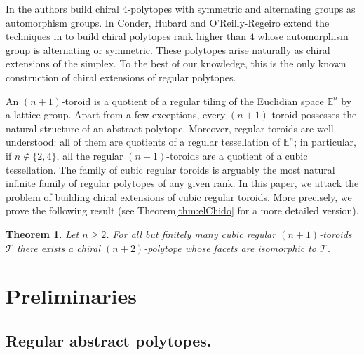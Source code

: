 \documentclass[final]{amsart}
\theoremstyle{plain}
\newtheorem{thm}{Theorem}[section]
\theoremstyle{definition}
\theoremstyle{remark}
\numberwithin{equation}{section}
\renewcommand{\{}{\lbrace}
\renewcommand{\}}{\rbrace}
\newcommand{\bE}{\mathbb{E}}
\newcommand{\cT}{\mathcal{T}}
\newcommand{\E}[1][n]{\bE^{#1}}
\begin{document}
In \cite{ConderHubardOReillyRegueiroPellicer_2015_ConstructionChiral4} the authors build chiral $4$-polytopes with symmetric and alternating groups as automorphism groups. 
In \cite{ConderHubardOReillyRegueiro_ConstructionChiralPolytopes_preprint} Conder, Hubard and O'Reilly-Regeiro extend the techniques in \cite{ConderHubardOReillyRegueiroPellicer_2015_ConstructionChiral4} to build chiral polytopes rank higher than $4$ whose automorphism group is alternating or symmetric. 
These polytopes arise naturally as chiral extensions of the simplex.
To the best of our knowledge, this is the only known construction of chiral extensions of regular polytopes. 

An $(n+1)$-toroid is a quotient of a regular tiling of the Euclidian space $\E$ by a lattice group. 
Apart from a few exceptions, every $(n+1)$-toroid possesses the natural structure of an abstract polytope. 
Moreover, regular toroids are well understood: all of them are quotients of a regular tessellation of $\E$; in particular, if $n\not \in  \{2,4\}$, all the regular $(n+1)$-toroids are a quotient of a cubic tessellation.
The family of cubic regular toroids is arguably the most natural infinite family of regular polytopes of any given rank.
In this paper, we attack the problem of building chiral extensions of cubic regular toroids. 
More precisely, we prove the following result (see Theorem\nobreakspace \ref {thm:elChido} for a more detailed version).

\begin{thm}\label{thm:elNoTanChido}
Let $n \geq 2$. For all but finitely many cubic regular $(n+1)$-toroids $\cT$ there exists a chiral $(n+2)$-polytope whose facets are isomorphic to $\cT$. 
\end{thm} \section{Preliminaries}
\label{sec:basics}

\subsection{Regular abstract polytopes.}\label{sec:HSAP}
\end{document}
